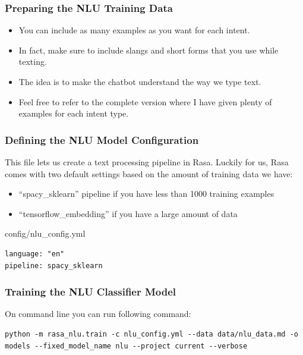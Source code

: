  \begin{frame}[fragile]\frametitle{Preparing the NLU Training Data}

\begin{itemize}
\item You can include as many examples as you want for each intent. 
\item In fact, make sure to include slangs and short forms that you use while texting. 
\item The idea is to make the chatbot understand the way we type text. 
\item Feel free to refer to the complete version where I have given plenty of examples for each intent type.
\end{itemize}

\end{frame}

 \begin{frame}[fragile]\frametitle{Defining the NLU Model Configuration}
This file lets us create a text processing pipeline in Rasa. Luckily for us, Rasa comes with two default settings based on the amount of training data we have:

\begin{itemize}
\item “spacy\_sklearn” pipeline if you have less than 1000 training examples
\item “tensorflow\_embedding” if you have a large amount of data
\end{itemize}

config/nlu\_config.yml
 
\begin{lstlisting}
language: "en"
pipeline: spacy_sklearn
\end{lstlisting}

\end{frame}

 \begin{frame}[fragile]\frametitle{Training the NLU Classifier Model}
On command line you can run following command:

\begin{lstlisting}
python -m rasa_nlu.train -c nlu_config.yml --data data/nlu_data.md -o models --fixed_model_name nlu --project current --verbose
\end{lstlisting}

\end{frame}

